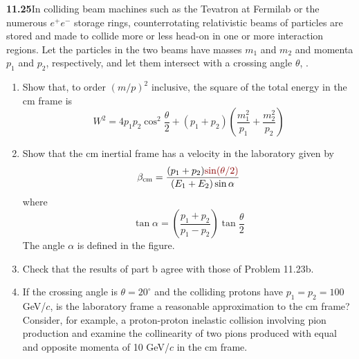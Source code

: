 \par\bigskip
\noindent\textbf{11.25}\quad In colliding beam machines such as the Tevatron at Fermilab or the numerous $e^{+}e^{-}$ storage rings, counterrotating relativistic beams of particles are stored and made to collide more or less head-on in one or more interaction regions. Let the particles in the two beams have masses $m_{1}$ and $m_{2}$ and momenta $p_{1}$ and $p_{2}$, respectively, and let them intersect with a crossing angle $\theta$, .
\begin{enumerate}
\item[(a)] Show that, to order $(m/p)^{2}$ inclusive, the square of the total energy in the cm frame is
\[
W^{2}=4p_{1}p_{2}\cos^{2}\frac{\theta}{2}+(p_{1}+p_{2})\!\left(\frac{m_{1}^{2}}{p_{1}}+\frac{m_{2}^{2}}{p_{2}}\right)
\]
\item[(b)] Show that the cm inertial frame has a velocity in the laboratory given by
\[
\beta_{\mathrm{cm}}=\frac{(p_{1}+p_{2})\erratum{\sin(\theta/2)}}{(E_{1}+E_{2})\sin\alpha}
\]
where
\[
\tan\alpha=\left(\frac{p_{1}+p_{2}}{p_{1}-p_{2}}\right)\tan\frac{\theta}{2}
\]
The angle $\alpha$ is defined in the figure.
\item[(c)] Check that the results of part b agree with those of Problem 11.23b.
\item[(d)] If the crossing angle is $\theta=20^{\circ}$ and the colliding protons have $p_{1}=p_{2}=100$ GeV/$c$, is the laboratory frame a reasonable approximation to the cm frame? Consider, for example, a proton-proton inelastic collision involving pion production and examine the collinearity of two pions produced with equal and opposite momenta of 10 GeV/$c$ in the cm frame.
\end{enumerate}

